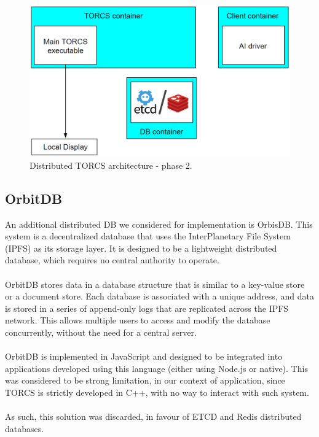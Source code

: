 \begin{figure}[h!]
	\centering
	\includegraphics[width=0.8\linewidth]{"immagini/Software development/Development-2"}
	\caption[Distributed TORCS architecture - phase 2.]{Distributed TORCS architecture - phase 2.}
	\label{fig:development-2}
\end{figure}

\subsection{OrbitDB}
An additional distributed DB we considered for implementation is OrbisDB. This system is a decentralized database that uses the InterPlanetary File System (IPFS) as its storage layer. It is designed to be a lightweight distributed database, which requires no central authority to operate. \\ \\
OrbitDB stores data in a database structure that is similar to a key-value store or a document store. Each database is associated with a unique address, and data is stored in a series of append-only logs that are replicated across the IPFS network. This allows multiple users to access and modify the database concurrently, without the need for a central server. \\ \\
OrbitDB is implemented in JavaScript and designed to be integrated into applications developed using this language (either using Node.js or native). This was considered to be strong limitation, in our context of application, since TORCS is strictly developed in C++, with no way to interact with such system. \\ \\
As such, this solution was discarded, in favour of ETCD and Redis distributed databases.

